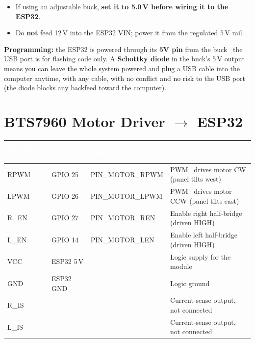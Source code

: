 \documentclass[11pt]{article}
\newcommand{\tc}[1]{\textcolor{white}{\textbf{#1}}}   %
\newcommand{\nd}{\textrm{\textemdash}}                %
\begin{document}
\begin{warnbox}
\begin{itemize}
  \item If using an adjustable buck, \textbf{set it to 5.0\,V before wiring it to
        the ESP32}.
  \item Do \textbf{not} feed 12\,V into the ESP32 VIN; power it from the regulated
        5\,V rail.
\end{itemize}
\end{warnbox}

\begin{notebox}
\textbf{Programming:} the ESP32 is powered through its \textbf{5V pin} from the
buck \nd\ the USB port is for flashing code only. A \textbf{Schottky diode} in the
buck's 5\,V output means you can leave the whole system powered and plug a USB
cable into the computer anytime, with any cable, with no conflict and no risk to
the USB port (the diode blocks any backfeed toward the computer).
\end{notebox}

\section*{BTS7960 Motor Driver $\rightarrow$ ESP32}
\begin{xltabular}{\textwidth}{@{}P{2.2cm} P{2.4cm} T{3cm} L@{}}
\toprule
{}\tc{BTS7960 Pin} & \tc{ESP32 GPIO} & \tc{Config symbol} & \tc{Description}\\
\midrule\endhead
RPWM & GPIO 25 & PIN_MOTOR_RPWM & PWM \nd\ drives motor CW (panel tilts west)\\
LPWM & GPIO 26 & PIN_MOTOR_LPWM & PWM \nd\ drives motor CCW (panel tilts east)\\
R_EN & GPIO 27 & PIN_MOTOR_REN & Enable right half-bridge (driven HIGH)\\
L_EN & GPIO 14 & PIN_MOTOR_LEN & Enable left half-bridge (driven HIGH)\\
VCC & ESP32 5\,V & \nd\ & Logic supply for the module\\
GND & ESP32 GND & \nd\ & Logic ground\\
R_IS & \nd\ & \nd\ & Current-sense output, not connected\\
L_IS & \nd\ & \nd\ & Current-sense output, not connected\\
\bottomrule
\end{xltabular}
\end{document}
